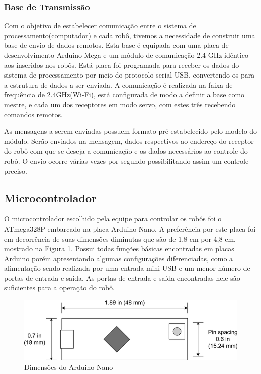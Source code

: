 \subsubsection{Base de Transmissão}

Com o objetivo de estabelecer comunicação entre o sistema de processamento(computador) e cada robô, tivemos a necessidade de construir uma base de envio de dados remotos. Esta base é equipada com uma placa de desenvolvimento Arduino Mega e um módulo de comunicação 2.4 GHz idêntico aos inseridos nos robôs. Está placa foi programada para receber os dados do sistema de processamento por meio do protocolo serial USB, convertendo-os para a estrutura de dados a ser enviada. A comunicação é realizada na faixa de frequência de 2.4GHz(Wi-Fi), está configurada de modo a definir a base como mestre, e cada um dos receptores em modo servo, com estes três recebendo comandos remotos.

As mensagens a serem enviadas possuem formato pré-estabelecido pelo modelo do módulo. Serão enviados na mensagem, dados respectivos ao endereço do receptor do robô com que se deseja a comunicação e os dados necessários ao controle do robô. O envio ocorre várias vezes por segundo possibilitando assim um controle preciso. 


\subsection{Microcontrolador}

O microcontrolador escolhido pela equipe para controlar os robôs foi o ATmega328P embarcado na placa Arduino Nano. A preferência por este placa foi em decorrência de suas dimensões diminutas que são de 1,8 cm por 4,8 cm, mostrado na Figura \ref{fig:nano}. Possui todas funções básicas encontradas em placas Arduino porém apresentando algumas configurações diferenciadas, como a alimentação sendo realizada por uma entrada mini-USB e um menor número de portas de entrada e saída. As portas de entrada e saída encontradas nele são suficientes para a operação do robô. 

\begin{figure}[htbp]
\centerline{\includegraphics[width=\columnwidth]{capitulos/imagens/arduino_nano.png}}
\caption{Dimensões do Arduino Nano}
\label{fig:nano}
\end{figure}




